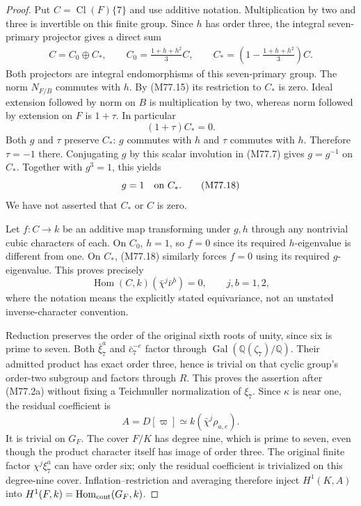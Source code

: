 \begin{proof}
Put $C=\operatorname{Cl}(F)\{7\}$ and use additive notation.
Multiplication by two and three is invertible on this finite
group. Since $h$ has order three, the integral seven-primary
projector gives a direct sum
\[
 \begin{gathered}
 C=C_0\oplus C_*,\qquad
 C_0=\frac{1+h+h^2}{3}C,\qquad
 C_*=\left(1-\frac{1+h+h^2}{3}\right)C.
 \end{gathered}\tag{M77.16}
\]
Both projectors are integral endomorphisms of this seven-primary group.
The norm $N_{F/B}$ commutes with $h$. By (M77.15) its
restriction to $C_*$ is zero. Ideal extension followed
by norm on $B$ is multiplication by two, whereas norm
followed by extension on $F$ is $1+\tau$. In particular
\[
                              (1+\tau)C_*=0.
 \tag{M77.17}
\]
Both $g$ and $\tau$ preserve $C_*$: $g$ commutes with $h$
and $\tau$ commutes with $h$. Therefore $\tau=-1$ there.
Conjugating $g$ by this scalar involution in (M77.7) gives
$g=g^{-1}$ on $C_*$. Together with $g^3=1$, this yields
\[
                                    g=1\quad\hbox{on }C_*.
 \tag{M77.18}
\]
We have not asserted that $C_*$ or $C$ is zero.

Let $f:C\to k$ be an additive map transforming under
$g,h$ through any nontrivial cubic characters of each.
On $C_0$, $h=1$, so $f=0$ since its required $h$-eigenvalue
is different from one. On $C_*$, (M77.18) similarly forces
$f=0$ using its required $g$-eigenvalue. This proves precisely
\[
 \operatorname{Hom}(C,k)(\bar\chi^j\bar\nu^b)=0,
                                      \qquad j,b=1,2,
 \tag{M77.19}
\]
where the notation means the explicitly stated equivariance,
not an unstated inverse-character convention.

Reduction preserves the order of the original sixth roots
of unity, since six is prime to seven. Both
$\bar\xi_7^a$ and $\bar c_7^{-e}$ factor through
$\operatorname{Gal}(\mathbb Q(\zeta_7)/\mathbb Q)$.
Their admitted product has exact order three, hence is
trivial on that cyclic group's order-two subgroup and
factors through $R$. This proves the assertion after
(M77.2a) without fixing a Teichmuller normalization of $\xi_7$.
Since $\kappa$ is near one, the residual coefficient is
\[
                     A=D[\varpi]\simeq k(\bar\chi^j\rho_{a,e}).
 \tag{M77.20}
\]
It is trivial on $G_F$. The cover $F/K$ has degree nine,
which is prime to seven, even though the product character
itself has image of order three. The original finite factor
$\chi^j\xi_7^a$ can have order six; only the residual
coefficient is trivialized on this degree-nine cover.
Inflation--restriction
and averaging therefore inject $H^1(K,A)$ into
$H^1(F,k)=\operatorname{Hom}_{\rm cont}(G_F,k)$.


\end{proof}
